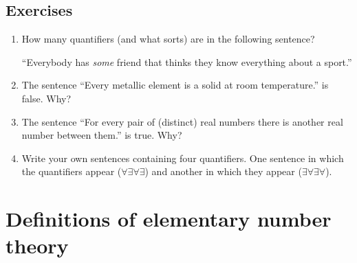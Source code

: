 \documentclass[10pt,]{book}
\theoremstyle{plain}
\theoremstyle{definition}
\theoremstyle{definition}
\numberwithin{equation}{section}
\newcommand{\hint}[1]{ }
\begin{document}
\subsection[{Exercises}]{Exercises}\label{exercises-3}
\leavevmode%
\begin{enumerate}[label=(\alph*)]
\item\hypertarget{li-39}{}
          How many quantifiers (and what sorts) are in the following sentence?

          ``Everybody has \emph{some} friend that thinks they know everything about 
          a sport.''
  


          \hint{Four.}
\item\hypertarget{li-40}{}
          The sentence ``Every metallic element is a solid at room temperature.'' 
          is false.  Why?



          \hint{The chemical symbol for an element that is an exception is Hg which stands for "Hydro-argyrum" it is also known as "liquid silver" or "quick silver".}
\item\hypertarget{li-41}{}
          The sentence ``For every pair of (distinct) real numbers there is 
          another real number between them.'' is true.  Why?



          \hint{Think about this: is there any way to (using a formula) find a number that lies in between two other numbers?}
\item\hypertarget{li-42}{}
          Write your own sentences containing four quantifiers.  One
          sentence in which the quantifiers appear (\(\forall \exists \forall \exists\))
          and another in which they appear (\(\exists \forall \exists \forall\)).



          \hint{You're on your own here. Be inventive!}
\end{enumerate}
\typeout{************************************************}
\typeout{************************************************}
\section[{Definitions of elementary number theory}]{Definitions of elementary number theory}\label{sec_num_thry}
\typeout{************************************************}
\typeout{************************************************}
\end{document}
